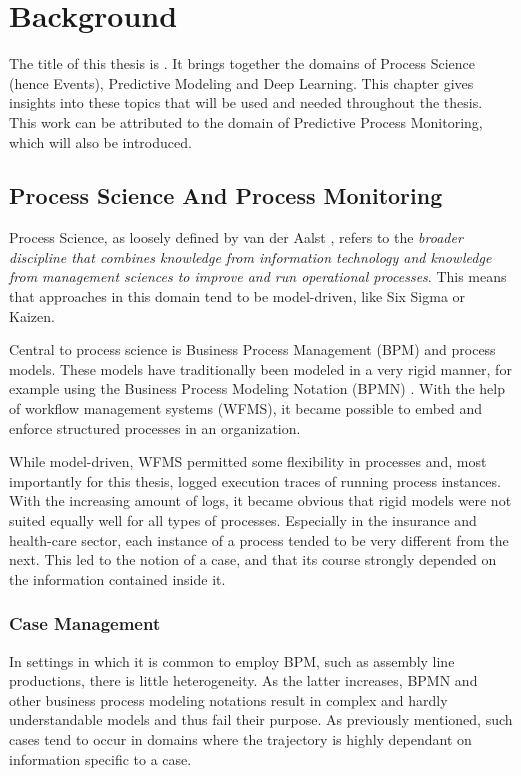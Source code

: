\chapter{Background}\label{chap:background}
The title of this thesis is \textit{\thesisTitle}.
It brings together the domains of Process Science (hence Events), Predictive Modeling and Deep Learning.
This chapter gives insights into these topics that will be used and needed throughout the thesis.
This work can be attributed to the domain of Predictive Process Monitoring, which will also be introduced.

\section{Process Science And Process Monitoring}
Process Science, as loosely defined by van der Aalst \cite{Aalst2016}, refers to the \textit{broader discipline that combines knowledge from information technology and knowledge from management sciences to improve and run operational processes}. This means that approaches in this domain tend to be model-driven, like Six Sigma or Kaizen.

Central to process science is Business Process Management (BPM) and process models.
These models have traditionally been modeled in a very rigid manner, for example using the Business Process Modeling Notation (BPMN) \cite{bpmn2.0}.
With the help of workflow management systems (WFMS), it became possible to embed and enforce structured processes in an organization.

While model-driven, WFMS permitted some flexibility in processes and, most importantly for this thesis, logged execution traces of running process instances. With the increasing amount of logs, it became obvious that rigid models were not suited equally well for all types of processes. Especially in the insurance and health-care sector, each instance of a process tended to be very different from the next. This led to the notion of a case, and that its course strongly depended on the information contained inside it.

\subsection{Case Management}
In settings in which it is common to employ BPM, such as assembly line productions, there is little heterogeneity. As the latter increases, BPMN and other business process modeling notations result in complex and hardly understandable models and thus fail their purpose. As previously mentioned, such cases tend to occur in domains where the trajectory is highly dependant on information specific to a case.

